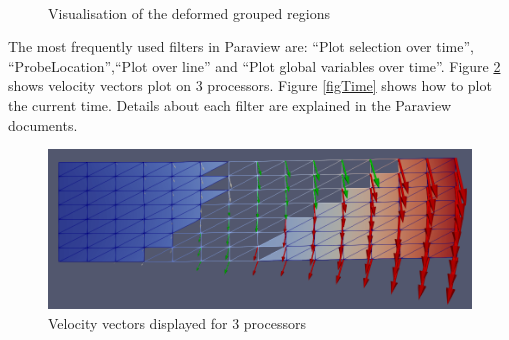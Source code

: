 \documentclass[oneside,11pt,times]{book}
\begin{document}
\begin{figure}[h!]
    \begin{center}
        \mbox{
            \quad
             }
        \caption{Visualisation of the deformed grouped regions}
        \label{figGroup}
    \end{center}
\end{figure}


The most frequently used filters in Paraview are: ``Plot selection over time'', ``ProbeLocation'',``Plot over line'' and ``Plot global variables over time''. Figure \ref{fig:VelPara} shows velocity vectors plot on 3 processors. Figure \ref{figTime} shows how to plot the current time. Details about each filter are explained in the Paraview documents.

\begin{figure}[htb]
\centering
\includegraphics[width=1\textwidth]{imgs/Outputs/Velocity.png}
\caption{Velocity vectors displayed for 3 processors}
\label{fig:VelPara}
\end{figure}
\end{document}
